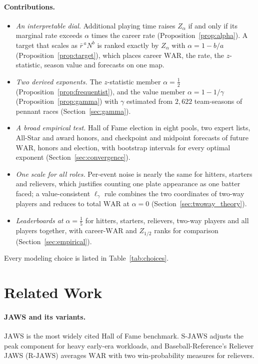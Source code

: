 \documentclass[11pt,letterpaper]{article}
\theoremstyle{plain}
\theoremstyle{definition}
\theoremstyle{remark}
\newcommand{\WAR}{\mathrm{WAR}}
\newcommand{\JAWS}{\mathrm{JAWS}}
\newcommand{\SJAWS}{\mathrm{S\text{-}JAWS}}
\newcommand{\RJAWS}{\mathrm{R\text{-}JAWS}}
\begin{document}
\paragraph{Contributions.}
\begin{itemize}
    \item[(i)] \emph{An interpretable dial.} Additional playing time raises $Z_\alpha$ if and only if its marginal rate exceeds $\alpha$ times the career rate (Proposition~\ref{prop:alpha}). A target that scales as $\bar r^{\,a} N^{b}$ is ranked exactly by $Z_\alpha$ with $\alpha = 1 - b/a$ (Proposition~\ref{prop:target}), which places career $\WAR$, the rate, the $z$-statistic, season value and forecasts on one map.
    \item[(ii)] \emph{Two derived exponents.} The $z$-statistic member $\alpha = \tfrac12$ (Proposition~\ref{prop:frequentist}), and the value member $\alpha = 1 - 1/\gamma$ (Proposition~\ref{prop:gamma}) with $\gamma$ estimated from $2{,}622$ team-seasons of pennant races (Section~\ref{sec:gamma}).
    \item[(iii)] \emph{A broad empirical test.} Hall of Fame election in eight pools, two expert lists, All-Star and award honors, and checkpoint and midpoint forecasts of future $\WAR$, honors and election, with bootstrap intervals for every optimal exponent (Section~\ref{sec:convergence}).
    \item[(iv)] \emph{One scale for all roles.} Per-event noise is nearly the same for hitters, starters and relievers, which justifies counting one plate appearance as one batter faced; a value-consistent $\ell_\gamma$ rule combines the two coordinates of two-way players and reduces to total $\WAR$ at $\alpha = 0$ (Section~\ref{sec:twoway_theory}).
    \item[(v)] \emph{Leaderboards at $\alpha = \tfrac15$} for hitters, starters, relievers, two-way players and all players together, with career-$\WAR$ and $Z_{1/2}$ ranks for comparison (Section~\ref{sec:empirical}).
\end{itemize}
Every modeling choice is listed in Table~\ref{tab:choices}.

\section{Related Work}
\label{sec:related}

\paragraph{JAWS and its variants.} $\JAWS$ \cite{jaffe2004,jaffe2017} is the most widely cited Hall of Fame benchmark. $\SJAWS$ \cite{jaffe2022} adjusts the peak component for heavy early-era workloads, and Baseball-Reference's Reliever JAWS ($\RJAWS$) \cite{bbrefjawsrp} averages $\WAR$ with two win-probability measures for relievers.
\end{document}
